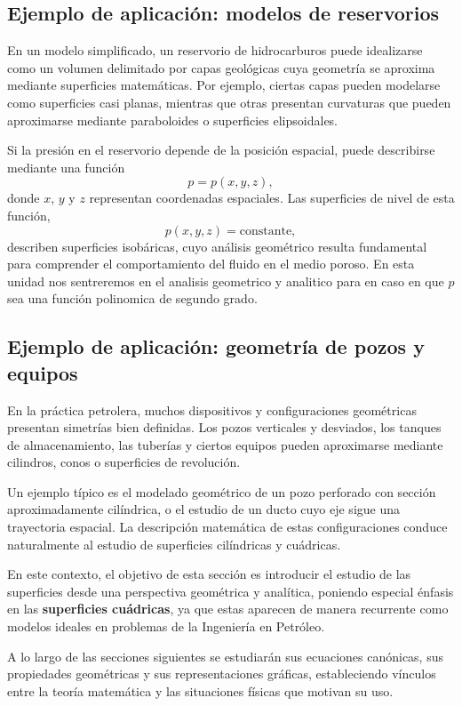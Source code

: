 \documentclass[11pt]{article}
\begin{document}
\subsection*{Ejemplo de aplicación: modelos de reservorios}

En un modelo simplificado, un reservorio de hidrocarburos puede idealizarse como un volumen delimitado por capas geológicas cuya geometría se aproxima mediante superficies matemáticas. Por ejemplo, ciertas capas pueden modelarse como superficies casi planas, mientras que otras presentan curvaturas que pueden aproximarse mediante paraboloides o superficies elipsoidales.

Si la presión en el reservorio depende de la posición espacial, puede describirse mediante una función
\[
p = p(x,y,z),
\]
donde $x$, $y$ y $z$ representan coordenadas espaciales. Las superficies de nivel de esta función,
\[
p(x,y,z)=\text{constante},
\]
describen superficies isobáricas, cuyo análisis geométrico resulta fundamental para comprender el comportamiento del fluido en el medio poroso. En esta unidad nos sentreremos en el analisis geometrico y analitico para en caso en que $p$ sea una función polinomica de segundo grado.

\subsection*{Ejemplo de aplicación: geometría de pozos y equipos}

En la práctica petrolera, muchos dispositivos y configuraciones geométricas presentan simetrías bien definidas. Los pozos verticales y desviados, los tanques de almacenamiento, las tuberías y ciertos equipos pueden aproximarse mediante cilindros, conos o superficies de revolución.

Un ejemplo típico es el modelado geométrico de un pozo perforado con sección aproximadamente cilíndrica, o el estudio de un ducto cuyo eje sigue una trayectoria espacial. La descripción matemática de estas configuraciones conduce naturalmente al estudio de superficies cilíndricas y cuádricas.

\medskip

En este contexto, el objetivo de esta sección es introducir el estudio de las superficies desde una perspectiva geométrica y analítica, poniendo especial énfasis en las \textbf{superficies cuádricas}, ya que estas aparecen de manera recurrente como modelos ideales en problemas de la Ingeniería en Petróleo.

A lo largo de las secciones siguientes se estudiarán sus ecuaciones canónicas, sus propiedades geométricas y sus representaciones gráficas, estableciendo vínculos entre la teoría matemática y las situaciones físicas que motivan su uso.
\end{document}
